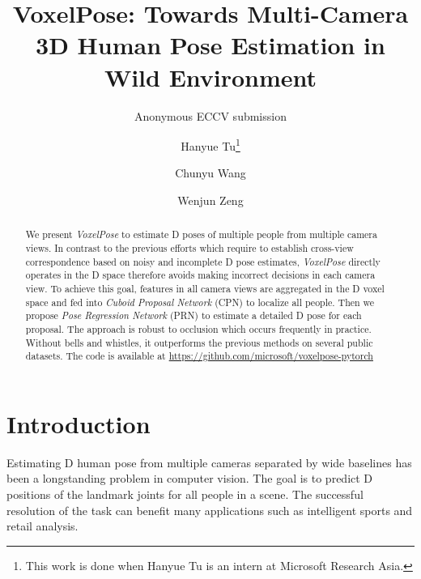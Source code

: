 \documentclass[runningheads]{llncs}
\def\etal{\emph{et al}. }
\begin{document}
\pagestyle{headings}
\mainmatter
\def\ECCVSubNumber{738}  

\title{VoxelPose: Towards Multi-Camera 3D Human Pose Estimation in Wild Environment}

\author{Anonymous ECCV submission}
\institute{Paper ID \ECCVSubNumber}

\author{Hanyue Tu\thanks{This work is done when Hanyue Tu is an intern at Microsoft Research Asia.} \and
Chunyu Wang \and
Wenjun Zeng}
\authorrunning{Tu \etal}

\maketitle

\begin{abstract}
We present \emph{VoxelPose} to estimate D poses of multiple people from multiple camera views. In contrast to the previous efforts which require to establish cross-view correspondence based on noisy and incomplete D pose estimates, \emph{VoxelPose} directly operates in the D space therefore avoids making incorrect decisions in each camera view. To achieve this goal, features in all camera views are aggregated in the D  voxel space and fed into \emph{Cuboid Proposal Network} (CPN) to localize all people. Then we propose \emph{Pose Regression Network} (PRN) to estimate a detailed D pose for each proposal. The approach is robust to occlusion which occurs frequently in practice. Without bells and whistles, it outperforms the previous methods on several public datasets.  The code is available at \href{https://github.com/microsoft/voxelpose-pytorch}{https://github.com/microsoft/voxelpose-pytorch}

\end{abstract}


\section{Introduction}
Estimating D human pose from multiple cameras separated by wide baselines \cite{belagiannis20153d,belagiannis20143d,belagiannis2014multiple,dong2019fast,bridgeman2019multi,qiu2019cross,zhang20204d} has been a longstanding problem in computer vision. The goal is to predict D positions of the landmark joints for all people in a scene. The successful resolution of the task can benefit many applications such as intelligent sports \cite{bridgeman2019multi} and retail analysis.
\end{document}
